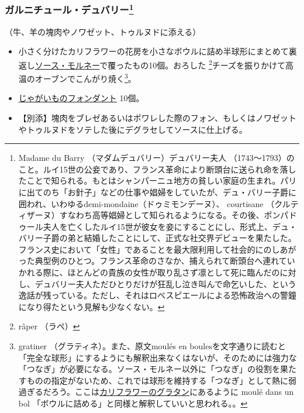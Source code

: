 \begin{recette}
{\subsubsection[ガルニチュール・デュバリー]{\texorpdfstring{ガルニチュール・デュバリー\footnote{Madame
  du Barry （マダムデュバリー）デュバリー夫人
  （1743〜1793）のこと。ルイ15世の公妾であり、フランス革命により断頭台に送られ命を落したことで知られる。もとはシャンパーニュ地方の貧しい家庭の生まれ。パリに出てのち「お針子」などの仕事や娼婦をしていたが、デュ・バリー子爵に囲われ、いわゆるdemi-mondaine（ドゥミモンデーヌ）、
  courtisane
  （クルティザーヌ）すなわち高等娼婦として知られるようになる。その後、ポンパドゥール夫人を亡くしたルイ15世が彼女を妾にすることにし、形式上、デュ・バリー子爵の弟と結婚したことにして、正式な社交界デビューを果たした。フランス史において「女性」であることを最大限利用して社会的にのしあがった典型例のひとつ。フランス革命のさなか、捕えられて断頭台へ連れていかれる際に、ほとんどの貴族の女性が取り乱さず凛として死に臨んだのに対し、デュバリー夫人ただひとりだけが狂乱し泣き叫んで命乞いした、という逸話が残っている。ただし、それはロベスピエールによる恐怖政治への警鐘になり得たという見解も少なくない。}}{ガルニチュール・デュバリー}}\label{garniture-dubarry}}



（牛、羊の塊肉やノワゼット、トゥルヌドに添える）

\begin{itemize}
\item
  小さく分けたカリフラワーの花房を小さなボウルに詰め半球形にまとめて裏返し\protect\hyperlink{sauce-mornay}{ソース・モルネー}で覆ったもの10個。おろした
  \footnote{râper （ラペ）}チーズを振りかけて高温のオーブンでこんがり焼く\footnote{gratiner
    （グラティネ）。また、原文moulés en
    boulesを文字通りに読むと「完全な球形」にするようにも解釈出来なくはないが、そのためには強力な「つなぎ」が必要になる。ソース・モルネー以外に「つなぎ」の役割を果たすものの指定がないため、これでは球形を維持する「つなぎ」として熱に弱過ぎるだろう。ここは\protect\hyperlink{chou-fleur-au-gratin}{カリフラワーのグラタン}にあるように
    moulé dans un bol
    「ボウルに詰める」と同様と解釈していいと思われる。。}。
\item
  \protect\hyperlink{pommes-de-terre-fondantes}{じゃがいものフォンダント}
  10個。
\item
  【別添】塊肉をブレゼあるいはポワレした際のフォン、もしくはノワゼットやトゥルヌドをソテした後にデグラセしてソースに仕上げる。
\end{itemize}


\end{recette}
